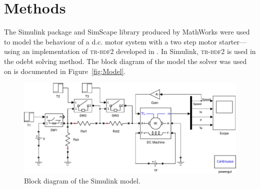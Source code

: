 \documentclass[a4paper,11pt,twocolumn]{article}
\newcommand{\DC}{d.c.\xspace}
\newcommand{\TRBDFII}{\textsc{tr-bdf\footnotesize2}\xspace}
\newcommand{\odetwothreebt}{ode\oldstylenums{23}bt\xspace}
\begin{document}
\section{Methods}

The Simulink package and SimScape library produced by MathWorks were used to 
model the behaviour of a \DC motor system with a two step motor starter---using 
an implementation of \TRBDFII developed in \cite{bank1985transient, 
hosea1996analysis}. In Simulink, \TRBDFII is used in the \odetwothreebt solving 
method. The block diagram of the model the solver was used on is documented in 
Figure~\vref{fig:Model}. 
\begin{figure}[t]
    \centering
    \includegraphics[width=\textwidth]{Model}
    \caption{Block diagram of the Simulink model.}
    \label{fig:Model}
\end{figure}
\end{document}
